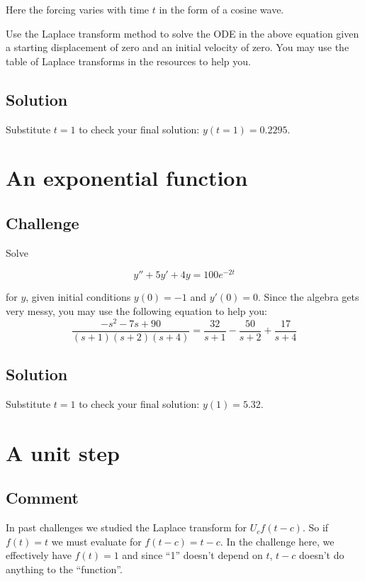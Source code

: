 Here the forcing varies with time $t$ in the form of a cosine wave.

Use the Laplace transform method to solve the ODE in the above equation given a starting displacement of zero and an initial velocity of zero. You may use the table of Laplace transforms in the resources to help you.

\subsection*{Solution}
Substitute $t=1$ to check your final solution: $y(t=1)=0.2295$.




\newpage
\section{An exponential function}

\subsection*{Challenge}
Solve

\begin{equation}
    y''+5y'+4y=100e^{-2t}
\end{equation}

for $y$, given initial conditions $y(0)=-1$ and $y'(0)=0$. Since the algebra gets very messy, you may use the following equation to help you:
\begin{equation}
    \frac{-s^2-7s+90}{(s+1)(s+2)(s+4)} = \frac{32}{s+1} - \frac{50}{s+2} + \frac{17}{s+4}
\end{equation}

\subsection*{Solution}
Substitute $t=1$ to check your final solution: $y(1)=5.32$.




\newpage
\section{A unit step}

\subsection*{Comment}
In past challenges we studied the Laplace transform for $U_c f(t-c)$. So if $f(t)=t$ we must evaluate for $f(t-c)=t-c$. In the challenge here, we effectively have $f(t)=1$ and since ``1'' doesn't depend on $t$, $t-c$ doesn't do anything to the ``function''.

